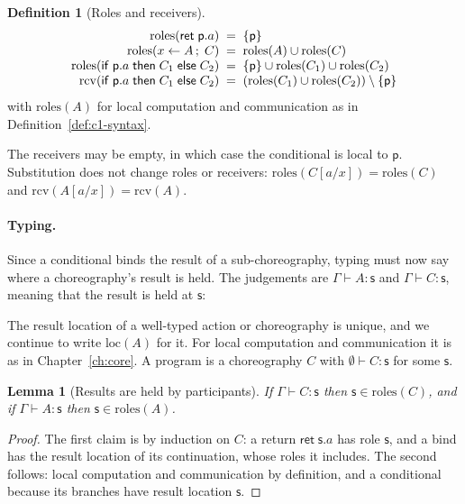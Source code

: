\documentclass[11pt]{report}
\theoremstyle{plain}
\newtheorem{lemma}[theorem]{Lemma}
\theoremstyle{definition}
\newtheorem{definition}[theorem]{Definition}
\theoremstyle{remark}
\newcommand{\kw}[1]{\mathsf{#1}}
\newcommand{\pp}{\mathsf{p}}
\newcommand{\qq}{\mathsf{q}}
\newcommand{\sr}{\mathsf{s}}
\newcommand{\bind}[3]{#1 \leftarrow #2\,;\;#3}
\newcommand{\cret}[1]{\kw{ret}\;#1}
\newcommand{\com}[3]{#1.#2 \to #3}
\newcommand{\cif}[4]{\kw{if}\;#1.#2\;\kw{then}\;#3\;\kw{else}\;#4}
\newcommand{\roles}[1]{\mathrm{roles}(#1)}
\newcommand{\rcv}[1]{\mathrm{rcv}(#1)}
\newcommand{\loc}[1]{\mathrm{loc}(#1)}
\begin{document}
\begin{definition}[Roles and receivers]\label{def:c2-roles}
  \[
  \begin{array}{r@{\;\;=\;\;}l}
    \roles{\cret{\pp.a}} & \{\pp\}\\
    \roles{\bind{x}{A}{C}} & \roles{A}\cup\roles{C}\\
    \roles{\cif{\pp}{a}{C_1}{C_2}} & \{\pp\}\cup\roles{C_1}\cup\roles{C_2}\\
    \rcv{\cif{\pp}{a}{C_1}{C_2}} & (\roles{C_1}\cup\roles{C_2})\setminus\{\pp\}
  \end{array}
  \]
  with $\roles{A}$ for local computation and communication as in
  Definition~\ref{def:c1-syntax}.
\end{definition}

The receivers may be empty, in which case the conditional is local to $\pp$.
Substitution does not change roles or receivers:
$\roles{C[a/x]}=\roles{C}$ and $\rcv{A[a/x]}=\rcv{A}$.

\paragraph{Typing.}
Since a conditional binds the result of a sub-choreography, typing must now
say where a choreography's result is held.  The judgements are
$\Gamma\vdash A:\sr$ and $\Gamma\vdash C:\sr$, meaning that the result is held
at $\sr$:
The result location of a well-typed action or choreography is unique, and we
continue to write $\loc{A}$ for it.  For local computation and communication
it is as in Chapter~\ref{ch:core}.  A program is a choreography $C$ with
$\emptyset\vdash C:\sr$ for some $\sr$.

\begin{lemma}[Results are held by participants]\label{lem:c2-locroles}
  If $\Gamma\vdash C:\sr$ then $\sr\in\roles{C}$, and if $\Gamma\vdash A:\sr$
  then $\sr\in\roles{A}$.
\end{lemma}
\begin{proof}
  The first claim is by induction on $C$: a return $\cret{\sr.a}$ has role
  $\sr$, and a bind has the result location of its continuation, whose roles
  it includes.  The second follows: local computation and communication by
  definition, and a conditional because its branches have result location
  $\sr$.
\end{proof}
\end{document}

